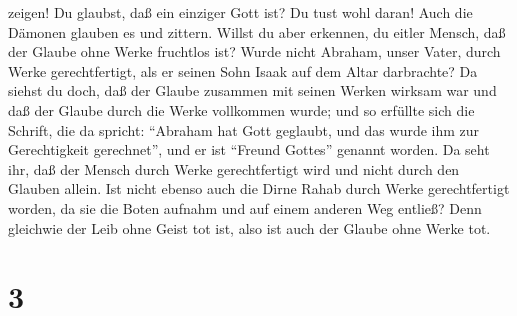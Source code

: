 zeigen!  Du glaubst, daß ein einziger Gott ist? Du tust
wohl daran! Auch die Dämonen glauben es und zittern. 
Willst du aber erkennen, du eitler Mensch, daß der Glaube ohne Werke
fruchtlos ist?  Wurde nicht Abraham, unser Vater, durch
Werke gerechtfertigt, als er seinen Sohn Isaak auf dem Altar darbrachte?
 Da siehst du doch, daß der Glaube zusammen mit seinen
Werken wirksam war und daß der Glaube durch die Werke vollkommen wurde;
 und so erfüllte sich die Schrift, die da spricht:
``Abraham hat Gott geglaubt, und das wurde ihm zur Gerechtigkeit
gerechnet'', und er ist ``Freund Gottes'' genannt worden.
 Da seht ihr, daß der Mensch durch Werke gerechtfertigt
wird und nicht durch den Glauben allein.  Ist nicht
ebenso auch die Dirne Rahab durch Werke gerechtfertigt worden, da sie
die Boten aufnahm und auf einem anderen Weg entließ? 
Denn gleichwie der Leib ohne Geist tot ist, also ist auch der Glaube
ohne Werke tot.

\hypertarget{section-2}{%
\section{3}\label{section-2}}

